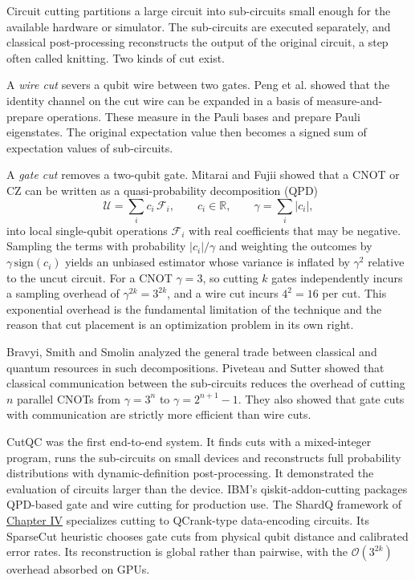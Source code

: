 \documentclass{report}
\theoremstyle{plain}
\theoremstyle{definition}
\theoremstyle{remark}
\newcommand{\bigO}[1]{\mathcal{O}\!\left(#1\right)}
\newcommand{\R}{\mathbb{R}}
\begin{document}
Circuit cutting partitions a large circuit into sub-circuits small enough for the available hardware or simulator. The sub-circuits are executed separately, and classical post-processing reconstructs the output of the original circuit, a step often called knitting. Two kinds of cut exist.

A \emph{wire cut} severs a qubit wire between two gates. Peng et al. \cite{peng2020circuitcutting} showed that the identity channel on the cut wire can be expanded in a basis of measure-and-prepare operations. These measure in the Pauli bases and prepare Pauli eigenstates. The original expectation value then becomes a signed sum of expectation values of sub-circuits.

A \emph{gate cut} removes a two-qubit gate. Mitarai and Fujii \cite{mitarai2021virtualgate} showed that a CNOT or CZ can be written as a quasi-probability decomposition (QPD)
\hypertarget{eq:bg:qpd}{}\[
\mathcal{U}=\sum_{i}c_i\,\mathcal{F}_i,\qquad c_i\in\R,\qquad \gamma=\sum_{i}|c_i|,
\tag{2.9}\]
into local single-qubit operations $\mathcal{F}_i$ with real coefficients that may be negative. Sampling the terms with probability $|c_i|/\gamma$ and weighting the outcomes by $\gamma\,\mathrm{sign}(c_i)$ yields an unbiased estimator whose variance is inflated by $\gamma^2$ relative to the uncut circuit. For a CNOT $\gamma=3$, so cutting $k$ gates independently incurs a sampling overhead of $\gamma^{2k}=3^{2k}$, and a wire cut incurs $4^2=16$ per cut. This exponential overhead is the fundamental limitation of the technique and the reason that cut placement is an optimization problem in its own right.

Bravyi, Smith and Smolin \cite{bravyi2016trading} analyzed the general trade between classical and quantum resources in such decompositions. Piveteau and Sutter \cite{piveteau2024knitting} showed that classical communication between the sub-circuits reduces the overhead of cutting $n$ parallel CNOTs from $\gamma=3^{n}$ to $\gamma=2^{n+1}-1$. They also showed that gate cuts with communication are strictly more efficient than wire cuts.

CutQC \cite{tang2021cutqc} was the first end-to-end system. It finds cuts with a mixed-integer program, runs the sub-circuits on small devices and reconstructs full probability distributions with dynamic-definition post-processing. It demonstrated the evaluation of circuits larger than the device. IBM's qiskit-addon-cutting packages QPD-based gate and wire cutting for production use. The ShardQ framework of \hyperref[ch:qml]{Chapter IV} \cite{guo2025shardq} specializes cutting to QCrank-type data-encoding circuits. Its SparseCut heuristic chooses gate cuts from physical qubit distance and calibrated error rates. Its reconstruction is global rather than pairwise, with the $\bigO{3^{2k}}$ overhead absorbed on GPUs.
\end{document}

